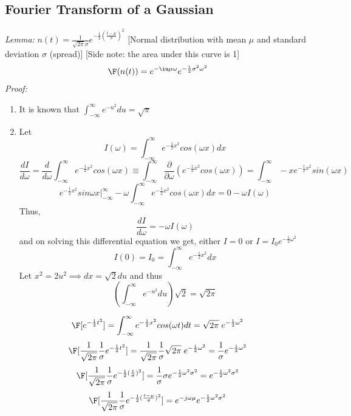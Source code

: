 \documentclass[11pt]{article}
\theoremstyle{definition}
\begin{document}
\subsection{Fourier Transform of a Gaussian}
\textit{Lemma:} $n(t) = \frac{1}{\sqrt{2\pi} \sigma} e^{-\frac{1}{2}(\frac{t-\mu}{\sigma})^2}$  [Normal distribution with mean $\mu$ and standard deviation $\sigma$ (spread)] [Side note: the area under this curve is 1]
$$\F(n(t)) = e^{-\iu \mu \omega} e^{-\frac{1}{2} \sigma^2 \omega^2}$$
\textit{Proof:}
\begin{enumerate}[]
    \item It is known that $\int^{\infty}_{-\infty} e^{-u^2} du = \sqrt{\pi}$
    \item Let $$I(\omega) = \int^{\infty}_{-\infty} e^{-\frac{1}{2}x^2}cos(\omega x) dx $$
    $$\frac{dI}{d\omega} = \frac{d}{d\omega} \int^{\infty}_{-\infty} e^{-\frac{1}{2}x^2}cos(\omega x) \equiv \int^{\infty}_{-\infty} \frac{\partial}{\partial\omega}( e^{-\frac{1}{2}x^2}cos(\omega x)) = \int^{\infty}_{-\infty} -xe^{-\frac{1}{2}x^2}sin(\omega x)$$
    $$e^{-\frac{1}{2}x^2} sin\omega x |^\infty_{-\infty} -\omega\int^{\infty}_{-\infty}e^{-\frac{1}{2}x^2}cos(\omega x) dx = 0 - \omega I(\omega)$$
    Thus,
    $$\frac{dI}{d\omega} = -\omega I(\omega)$$ and on solving this differential equation we get,
    either $I = 0$ or $I = I_0e^{-\frac{1}{2}\omega^2}$\\
    $$I(0) = I_0 = \int^{\infty}_{-\infty}e^{-\frac{1}{2}x^2}dx $$
    Let $x^2 = 2u^2 \implies dx = \sqrt{2} du$ and thus
    $$(\int^{\infty}_{-\infty} e^{-u^2}du)\sqrt{2} = \sqrt{2\pi}$$
\end{enumerate}
$$\F[e^{-\frac{1}{2}t^2}] = \int_{-\infty}^\infty e^{-\frac{1}{2}x^2}cos(\omega t) dt = \sqrt{2\pi}\;e^{-\frac{1}{2}\omega^2}$$
$$\F[\frac{1}{\sqrt{2\pi}} \frac{1}{\sigma} e^{-\frac{1}{2}t^2}] = \frac{1}{\sqrt{2\pi}} \frac{1}{\sigma} \sqrt{2\pi}\;e^{-\frac{1}{2}\omega^2} = \frac{1}{\sigma}e^{-\frac{1}{2}\omega^2}$$
$$\F[\frac{1}{\sqrt{2\pi}} \frac{1}{\sigma} e^{-\frac{1}{2}(\frac{t}{\sigma})^2}] = \frac{1}{\sigma}\sigma e^{-\frac{1}{2}\omega^2\sigma^2} = e^{-\frac{1}{2}\omega^2\sigma^2}$$
$$\F[\frac{1}{\sqrt{2\pi}} \frac{1}{\sigma} e^{-\frac{1}{2}(\frac{t-\mu}{\sigma})^2}]  = e^{-j\omega \mu}e^{-\frac{1}{2}\omega^2\sigma^2}$$
\end{document}
